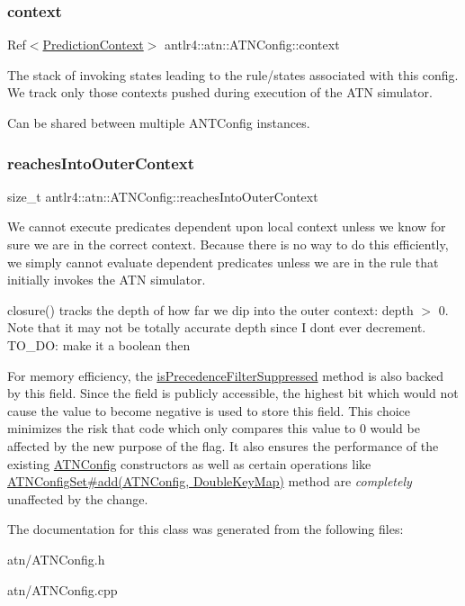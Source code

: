 \subsubsection{\texorpdfstring{context}{context}}
{\footnotesize\ttfamily Ref$<$\hyperlink{classantlr4_1_1atn_1_1PredictionContext}{Prediction\+Context}$>$ antlr4\+::atn\+::\+A\+T\+N\+Config\+::context}

The stack of invoking states leading to the rule/states associated with this config. We track only those contexts pushed during execution of the A\+TN simulator.

Can be shared between multiple A\+N\+T\+Config instances. \mbox{\label{classantlr4_1_1atn_1_1ATNConfig_a3dda5924725f5c1cb7d798dea4b4fca7}} 
\subsubsection{\texorpdfstring{reaches\+Into\+Outer\+Context}{reachesIntoOuterContext}}
{\footnotesize\ttfamily size\+\_\+t antlr4\+::atn\+::\+A\+T\+N\+Config\+::reaches\+Into\+Outer\+Context}

We cannot execute predicates dependent upon local context unless we know for sure we are in the correct context. Because there is no way to do this efficiently, we simply cannot evaluate dependent predicates unless we are in the rule that initially invokes the A\+TN simulator.

closure() tracks the depth of how far we dip into the outer context\+: depth $>$ 0. Note that it may not be totally accurate depth since I don\textquotesingle{}t ever decrement. T\+O\+\_\+\+DO\+: make it a boolean then

For memory efficiency, the \hyperlink{}{is\+Precedence\+Filter\+Suppressed} method is also backed by this field. Since the field is publicly accessible, the highest bit which would not cause the value to become negative is used to store this field. This choice minimizes the risk that code which only compares this value to 0 would be affected by the new purpose of the flag. It also ensures the performance of the existing \hyperlink{classantlr4_1_1atn_1_1ATNConfig}{A\+T\+N\+Config} constructors as well as certain operations like \hyperlink{}{A\+T\+N\+Config\+Set\#add(\+A\+T\+N\+Config, Double\+Key\+Map)} method are {\itshape completely} unaffected by the change.

The documentation for this class was generated from the following files\+:\begin{DoxyCompactItemize}
\item 
atn/A\+T\+N\+Config.\+h\item 
atn/A\+T\+N\+Config.\+cpp\end{DoxyCompactItemize}
